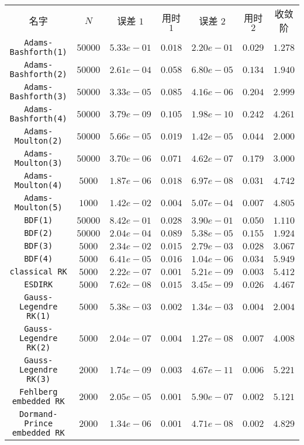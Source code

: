 \begin{tabular}{c|c|c|c|c|c|c}
名字&$N$&误差 $1$&用时 $1$&误差 $2$&用时 $2$&收敛阶\\
\texttt{Adams-Bashforth(1)}&$50000$&$5.33e-01$&$0.018$&$2.20e-01$&$0.029$&$1.278$\\
\texttt{Adams-Bashforth(2)}&$50000$&$2.61e-04$&$0.058$&$6.80e-05$&$0.134$&$1.940$\\
\texttt{Adams-Bashforth(3)}&$50000$&$3.33e-05$&$0.085$&$4.16e-06$&$0.204$&$2.999$\\
\texttt{Adams-Bashforth(4)}&$50000$&$3.79e-09$&$0.105$&$1.98e-10$&$0.242$&$4.261$\\
\texttt{Adams-Moulton(2)}&$50000$&$5.66e-05$&$0.019$&$1.42e-05$&$0.044$&$2.000$\\
\texttt{Adams-Moulton(3)}&$50000$&$3.70e-06$&$0.071$&$4.62e-07$&$0.179$&$3.000$\\
\texttt{Adams-Moulton(4)}&$5000$&$1.87e-06$&$0.018$&$6.97e-08$&$0.031$&$4.742$\\
\texttt{Adams-Moulton(5)}&$1000$&$1.42e-02$&$0.004$&$5.07e-04$&$0.007$&$4.805$\\
\texttt{BDF(1)}&$50000$&$8.42e-01$&$0.028$&$3.90e-01$&$0.050$&$1.110$\\
\texttt{BDF(2)}&$50000$&$2.04e-04$&$0.089$&$5.38e-05$&$0.155$&$1.924$\\
\texttt{BDF(3)}&$5000$&$2.34e-02$&$0.015$&$2.79e-03$&$0.028$&$3.067$\\
\texttt{BDF(4)}&$5000$&$6.41e-05$&$0.016$&$1.04e-06$&$0.034$&$5.949$\\
\texttt{classical RK}&$5000$&$2.22e-07$&$0.001$&$5.21e-09$&$0.003$&$5.412$\\
\texttt{ESDIRK}&$5000$&$7.62e-08$&$0.015$&$3.45e-09$&$0.026$&$4.467$\\
\texttt{Gauss-Legendre RK(1)}&$5000$&$5.38e-03$&$0.002$&$1.34e-03$&$0.004$&$2.004$\\
\texttt{Gauss-Legendre RK(2)}&$5000$&$2.04e-07$&$0.004$&$1.27e-08$&$0.007$&$4.008$\\
\texttt{Gauss-Legendre RK(3)}&$2000$&$1.74e-09$&$0.003$&$4.67e-11$&$0.006$&$5.221$\\
\texttt{Fehlberg embedded RK}&$2000$&$2.05e-05$&$0.001$&$5.90e-07$&$0.002$&$5.121$\\
\texttt{Dormand-Prince embedded RK}&$2000$&$1.34e-06$&$0.001$&$4.71e-08$&$0.002$&$4.829$\\
\end{tabular}
